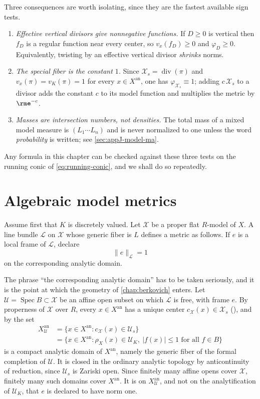 \noindent Three consequences are worth isolating, since they are the
fastest available sign tests.
\begin{enumerate}
\item \emph{Effective vertical divisors give nonnegative functions.} If
$D\ge0$ is vertical then $f_D$ is a regular function near every center,
so $v_x(f_D)\ge0$ and $\varphi_D\ge0$. Equivalently, twisting by an
effective vertical divisor \emph{shrinks} norms.
\item \emph{The special fiber is the constant $1$.} Since
$\mathcal X_s=\operatorname{div}(\pi)$ and $v_x(\pi)=v_K(\pi)=1$ for
every $x\in X^{\mathrm{an}}$, one has $\varphi_{\mathcal X_s}\equiv1$;
adding $c\,\mathcal X_s$ to a divisor adds the constant $c$ to its model
function and multiplies the metric by $\rme^{-c}$.
\item \emph{Masses are intersection numbers, not densities.} The total mass
of a mixed model measure is $(L_1\cdots L_n)$ and is never normalized to
one unless the word \emph{probability} is written; see
\cref{sec:appJ-model-ma}.
\end{enumerate}
Any formula in this chapter can be checked against these three tests on the
running conic of \eqref{eq:running-conic}, and we shall do so repeatedly.

\section{Algebraic model metrics}
\label{sec:metrics-model}

Assume first that $K$ is discretely valued. Let $\mathcal X$ be a proper
flat $R$-model of $X$. A line bundle $\mathcal L$ on $\mathcal X$
whose generic fiber is $L$ defines a metric as follows. If $e$ is a local
frame of $\mathcal L$, declare
\[
                              \|e\|_{\mathcal L}=1
\]
on the corresponding analytic domain.

The phrase ``the corresponding analytic domain'' has to be taken seriously,
and it is the point at which the geometry of \cref{chap:berkovich} enters.
Let $\mathcal U=\operatorname{Spec}B\subset\mathcal X$ be an affine open
subset on which $\mathcal L$ is free, with frame $e$. By properness of
$\mathcal X$ over $R$, every $x\in X^{\mathrm{an}}$ has a unique center
$c_{\mathcal X}(x)\in\mathcal X_s$ (),
and by  the set
\[
\begin{split}
 X^{\mathrm{an}}_{\mathcal U}
 &=\{x\in X^{\mathrm{an}}:c_{\mathcal X}(x)\in\mathcal U_s\}\\
 &=\{x\in X^{\mathrm{an}}:\rho_X(x)\in\mathcal U_K,\
   |f(x)|\le1\text{ for all }f\in B\}
\end{split}
\]
is a compact analytic domain of $X^{\mathrm{an}}$, namely the generic
fiber of the formal completion of $\mathcal U$. It is closed in the
ordinary analytic topology by anticontinuity of reduction, since
$\mathcal U_s$ is Zariski open. Since finitely many
affine opens cover $\mathcal X$, finitely many such domains cover
$X^{\mathrm{an}}$. It is on $X^{\mathrm{an}}_{\mathcal U}$, and not on
the analytification of $\mathcal U_K$, that $e$ is declared to have norm
one.

